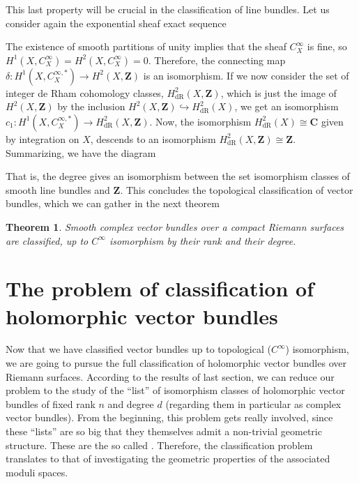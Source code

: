 \documentclass[12pt,a4paper]{book}
\newtheorem{thm}{Theorem}[section]
\theoremstyle{definition} \newtheorem{defn}[thm]{Definition}
\theoremstyle{definition} \newtheorem{ejemplo}[thm]{Example}
\theoremstyle{remark} \newtheorem{rem}[thm]{Remark}
\def\CC{\mathbf{C}}
\def\ZZ{\mathbf{Z}}
\let\emph\relax
\begin{document}
This last property will be crucial in the classification of line bundles. Let us consider again the exponential sheaf exact sequence
      \begin{center}
       \end{center}
       The existence of smooth partitions of unity implies that the sheaf $C^\infty_X$ is fine, so $H^1(X,C^\infty_X)=H^2(X,C^\infty_X)=0$. Therefore, the connecting map $\delta:H^1(X,C^{\infty,*}_X)\rightarrow H^2(X,\ZZ)$ is an isomorphism. If we now consider the set of integer de Rham cohomology classes, $H^2_{\mathrm{dR}}(X,\ZZ)$, which is just the image of $H^2(X,\ZZ)$ by the inclusion $H^2(X,\ZZ)\hookrightarrow H^2_{\mathrm{dR}}(X)$, we get an isomorphism $c_1:H^1(X,C_X^{\infty,*})\rightarrow H^2_{\mathrm{dR}}(X,\ZZ)$. Now, the isomorphism $H^2_{\mathrm{dR}}(X) \cong \CC$ given by integration on $X$, descends to an isomorphism $H^2_{\mathrm{dR}}(X,\ZZ) \cong \ZZ$.
    Summarizing, we have the diagram
       \begin{center}
       \end{center}
       That is, the degree gives an isomorphism between the set isomorphism classes of smooth line bundles and $\ZZ$. This concludes the topological classification of vector bundles, which we can gather in the next theorem
       \begin{thm}
	 Smooth complex vector bundles over a compact Riemann surfaces are classified, up to $C^\infty$ isomorphism by their rank and their degree.
       \end{thm}
  
       \section{The problem of classification of holomorphic vector bundles}
       Now that we have classified vector bundles up to topological ($C^\infty$) isomorphism, we are going to pursue the full classification of holomorphic vector bundles over Riemann surfaces. According to the results of last section, we can reduce our problem to the study of the ``list'' of isomorphism classes of holomorphic vector bundles of fixed rank $n$ and degree $d$ (regarding them in particular as complex vector bundles). From the beginning, this problem gets really involved, since these ``lists'' are so big that they themselves admit a non-trivial geometric structure. These are the so called \emph{moduli spaces}. Therefore, the classification problem translates to that of investigating the geometric properties of the associated moduli spaces.
\end{document}
